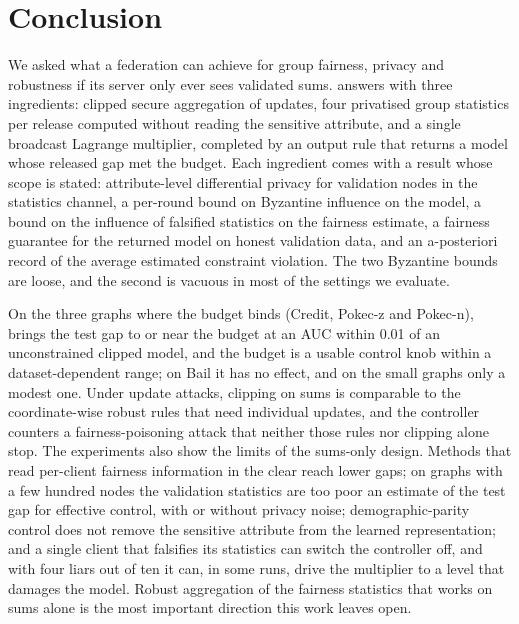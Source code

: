 \section{Conclusion}\label{sec:conclusion}

We asked what a federation can achieve for group fairness, privacy and robustness if its server only ever sees validated sums. \clamp{} answers with three ingredients: clipped secure aggregation of updates, four privatised group statistics per release computed without reading the sensitive attribute, and a single broadcast Lagrange multiplier, completed by an output rule that returns a model whose released gap met the budget. Each ingredient comes with a result whose scope is stated: attribute-level differential privacy for validation nodes in the statistics channel, a per-round bound on Byzantine influence on the model, a bound on the influence of falsified statistics on the fairness estimate, a fairness guarantee for the returned model on honest validation data, and an a-posteriori record of the average estimated constraint violation. The two Byzantine bounds are loose, and the second is vacuous in most of the settings we evaluate.

On the three graphs where the budget binds (Credit, Pokec-z and Pokec-n), \clamp{} brings the test gap to or near the budget at an AUC within 0.01 of an unconstrained clipped model, and the budget is a usable control knob within a dataset-dependent range; on Bail it has no effect, and on the small graphs only a modest one. Under update attacks, clipping on sums is comparable to the coordinate-wise robust rules that need individual updates, and the controller counters a fairness-poisoning attack that neither those rules nor clipping alone stop. The experiments also show the limits of the sums-only design. Methods that read per-client fairness information in the clear reach lower gaps; on graphs with a few hundred nodes the validation statistics are too poor an estimate of the test gap for effective control, with or without privacy noise; demographic-parity control does not remove the sensitive attribute from the learned representation; and a single client that falsifies its statistics can switch the controller off, and with four liars out of ten it can, in some runs, drive the multiplier to a level that damages the model. Robust aggregation of the fairness statistics that works on sums alone is the most important direction this work leaves open.
